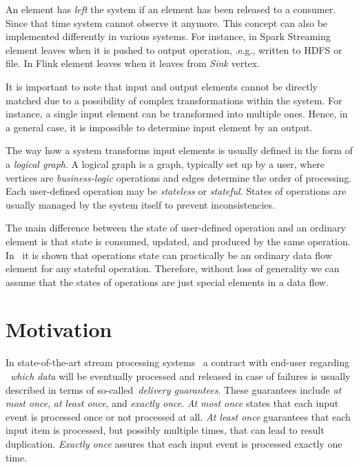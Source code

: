 \documentclass[sigconf]{acmart}
\theoremstyle{remark}
\begin{document}
An element has {\em left} the system if an element has been released to a consumer. Since that time system cannot observe it anymore. This concept can also be implemented differently in various systems. For instance, in Spark Streaming element leaves when it is pushed to output operation, .e.g., written to HDFS or file. In Flink element leaves when it leaves from {\em Sink} vertex.   

It is important to note that input and output elements cannot be directly matched due to a possibility of complex transformations within the system. For instance, a single input element can be transformed into multiple ones. Hence, in a general case, it is impossible to determine input element by an output.

The way how a system transforms input elements is usually defined in the form of a {\em logical graph}. A logical graph is a graph, typically set up by a user, where vertices are {\em business-logic} operations and edges determine the order of processing. Each user-defined operation may be {\em stateless} or {\em stateful}. States of operations are usually managed by the system itself to prevent inconsistencies.

The main difference between the state of user-defined operation and an ordinary element is that state is consumed, updated, and produced by the same operation. In~\cite{we2018adbis} it is shown that operations state can practically be an ordinary data flow element for any stateful operation. Therefore, without loss of generality we can assume that the states of operations are just special elements in a data flow.

\section {Motivation}

In state-of-the-art stream processing systems~\cite{carbone2015apache, apache:storm, Zaharia:2016:ASU:3013530.2934664} a contract with end-user regarding ~{\em which data} will be eventually processed and released in case of failures is usually described in terms of so-called~{\em delivery guarantees}. These guarantees include {\em at most once}, {\em at least once}, and {\em exactly once}. {\it At most once} states that each input event is processed once or not processed at all. {\it At least once} guarantees that each input item is processed, but possibly multiple times, that can lead to result duplication. {\it Exactly once} assures that each input event is processed exactly one time.
\end{document}
